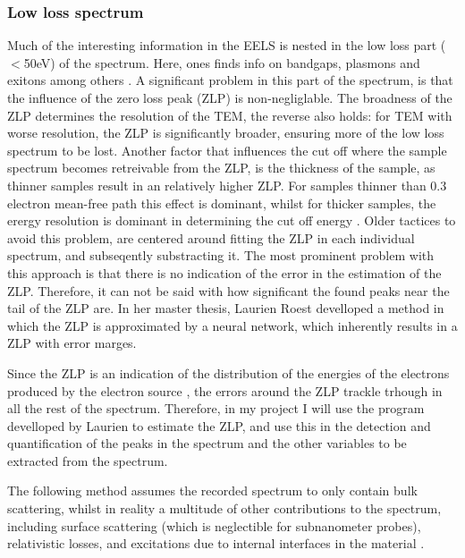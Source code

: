 \subsubsection{Low loss spectrum}
Much of the interesting information in the EELS is nested in the low loss part ($<$50eV) of the spectrum. Here, ones finds info on bandgaps, plasmons and exitons among others \cite{egerton_book}. A significant problem in this part of the spectrum, is that the influence of the zero loss peak (ZLP) is non-negliglable. The broadness of the ZLP determines the resolution of the TEM, the reverse also holds: for TEM with worse resolution, the ZLP is significantly broader, ensuring more of the low loss spectrum to be lost. Another factor that influences the cut off where the sample spectrum becomes retreivable from the ZLP, is the thickness of the sample, as thinner samples result in an relatively higher ZLP. For samples thinner than 0.3 electron mean-free path this effect is dominant, whilst for thicker samples, the erergy resolution is dominant in determining the cut off energy \cite{potapov}.
Older tactices to avoid this problem, are centered around fitting the ZLP in each individual spectrum, and subseqently substracting it. The most prominent problem with this approach is that there is no indication of the error in the estimation of the ZLP. Therefore, it can not be said with how significant the found peaks near the tail of the ZLP are. In her master thesis, Laurien Roest develloped a method in which the ZLP is approximated by a neural network, which inherently results in a ZLP with error marges. 

Since the ZLP is an indication of the distribution of the energies of the electrons produced by the electron source \cite{egerton_article}, the errors around the ZLP trackle trhough in all the rest of the spectrum. Therefore, in my project I will use the program develloped by Laurien to estimate the ZLP, and use this in the detection and quantification of the peaks in the spectrum and the other variables to be extracted from the spectrum.



The following method assumes the recorded spectrum to only contain bulk scattering, whilst in reality a multitude of other contributions to the spectrum, including surface scattering (which is neglectible for subnanometer probes\cite{brockt_lakner_2000}), relativistic losses, and excitations due to internal interfaces in the material \cite{potapov}.


